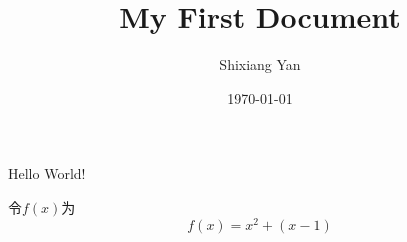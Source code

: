 \documentclass{article}%
\title{My First Document}
\author{Shixiang Yan}
\date{\today}
\begin{document}
	\maketitle
	Hello World!
	
	
	令$f(x)$为$$f(x)=x^2+(x-1)$$%
\end{document}
